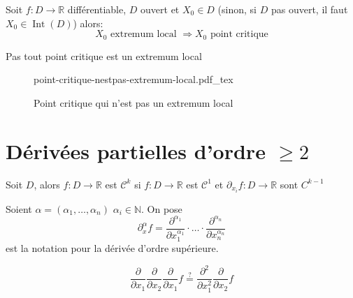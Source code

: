 \documentclass[a4paper]{report}
\newcommand\N{\ensuremath{\mathbb{N}}}
\newcommand\R{\ensuremath{\mathbb{R}}}
\let\implies\Rightarrow
\theoremstyle{definition}
\newcommand{\incfig}[1]{%
    \def\svgwidth{\columnwidth}
    {#1.pdf_tex}
}
\begin{document}
\begin{theorem}
    Soit $f: D \longrightarrow \R$ différentiable, $D$ ouvert et  $X_0 \in D$ (sinon, si $D$ pas ouvert, il faut  $X_0 \in \operatorname{Int}(D)$) alors:
    \[
        X_0 \text{ extremum local } \implies X_0 \text{ point critique} 
    \] 
\end{theorem}

\begin{eg} Pas tout point critique est un extremum local
\begin{figure}[H]
    \centering
    \incfig{point-critique-nestpas-extremum-local}
    \caption{Point critique qui n'est pas un extremum local}
    \label{fig:point-critique-nestpas-extremum-local}
\end{figure}
\end{eg}

\section{Dérivées partielles d'ordre $\ge 2$}
\begin{definition}
    Soit $D$, alors  $f: D \to \R$ est $\mathcal{C}^k$ si  $f: D \to \R$ est $\mathcal{C}^1$ et  $\partial_{x_i}f: D \to \R$ sont $C^{k-1}$
\end{definition}

\begin{definition}
    Soient $\alpha = (\alpha_1, \ldots, \alpha_n)$ \quad $\alpha_i \in \N$. On pose
    \[
        \partial_{x}^{\alpha}f = \frac{\partial^{\alpha_1}}{\partial x_1^{\alpha_1}} \cdot \ldots \cdot \frac{\partial^{\alpha_n}}{\partial x_n^{\alpha_n}}
    \] 
    est la notation pour la dérivée d'ordre supérieure.
\end{definition}
\[
    \frac{\partial}{\partial x_1}\frac{\partial}{\partial x_2}\frac{\partial}{\partial x_1} f \overset{?}{=}  \frac{\partial^2}{\partial x_1^2}\frac{\partial}{\partial x_2}f
\] 
\end{document}
